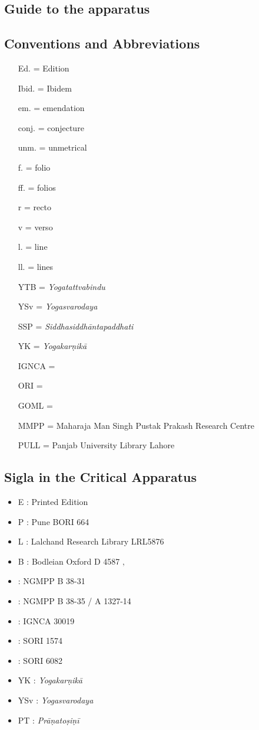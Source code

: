 \subsection{Guide to the apparatus}

\subsection{Conventions and Abbreviations}
\begin{itemize}
\item[Ed.] = Edition
\item[Ibid.] = Ibidem
\item[em.] = emendation
\item[conj.] = conjecture
\item[unm.] = unmetrical
\item[f.] = folio
\item[ff.] = folios
\item[r] = recto
\item[v] = verso
\item[l.] = line
\item[ll.] = lines 
\item[YTB] = \emph{Yogatattvabindu} 
\item[YSv] = \emph{Yogasvarodaya}
\item[SSP] = \emph{Siddhasiddhāntapaddhati}
\item[YK] = \emph{Yogakarṇikā}
\item[IGNCA] =
\item[ORI] =
\item[GOML] =
\item[MMPP] = Maharaja Man Singh Pustak Prakash Research Centre
\item[PULL] = Panjab University Library Lahore
    
  
\end{itemize}

\subsection{Sigla in the Critical Apparatus}

\begin{itemize}
\item E : Printed Edition
\item P : Pune BORI 664
\item L : Lalchand Research Library LRL5876
\item B : Bodleian Oxford D 4587
‚\item \None : NGMPP B 38-31
\item \Ntwo : NGMPP B 38-35 / A 1327-14
\item \Done : IGNCA 30019
\item \Uone : SORI 1574
\item \Utwo : SORI 6082
\item YK : \emph{Yogakarṇikā}
\item YSv : \emph{Yogasvarodaya}
\item PT : \emph{Prāṇatoṣiṇī}
\end{itemize}



